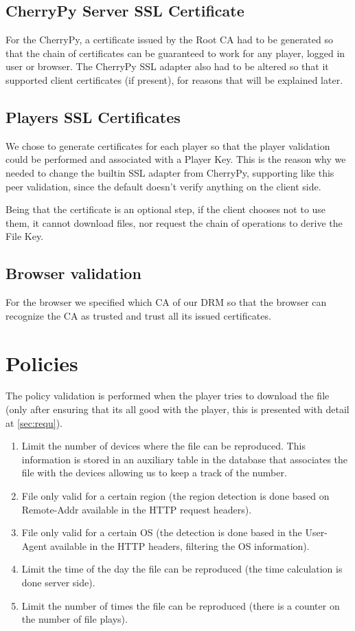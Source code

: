 \documentclass[11pt,a4paper]{report}
\begin{document}
\section{CherryPy Server SSL Certificate}

For the CherryPy, a certificate issued by the Root CA had to be generated so that the chain of certificates can be guaranteed to work for any player, logged in user or browser. The CherryPy SSL adapter also had to be altered so that it supported client certificates (if present), for reasons that will be explained later.

\section{Players SSL Certificates}

We chose to generate certificates for each player so that the player validation could be performed and associated with a Player Key. This is the reason why we needed to change the builtin SSL adapter from CherryPy, supporting like this peer validation, since the default doesn't verify anything on the client side.

Being that the certificate is an optional step, if the client chooses not to use them, it cannot download files, nor request the chain of operations to derive the File Key.

\section{Browser validation}
For the browser we specified which CA of our DRM so that the browser can recognize the CA as trusted and trust all its issued certificates.

\chapter{Policies}
The policy validation is performed when the player tries to download the file (only after ensuring that its all good with the player, this is presented with detail at  \autoref{sec:requ}).
\begin{enumerate}
\item Limit the number of devices where the file can be reproduced. This information is stored in an auxiliary table in the database that associates the file with the devices allowing us to keep a track of the number.
\item File only valid for a certain region (the region detection is done based on Remote-Addr available in the HTTP request headers).
\item File only valid for a certain OS (the detection is done based in the User-Agent available in the HTTP headers, filtering the OS information).
\item Limit the time of the day the file can be reproduced (the time calculation is done server side).
\item Limit the number of times the file can be reproduced (there is a counter on the number of file plays).
\end{enumerate}
\end{document}
